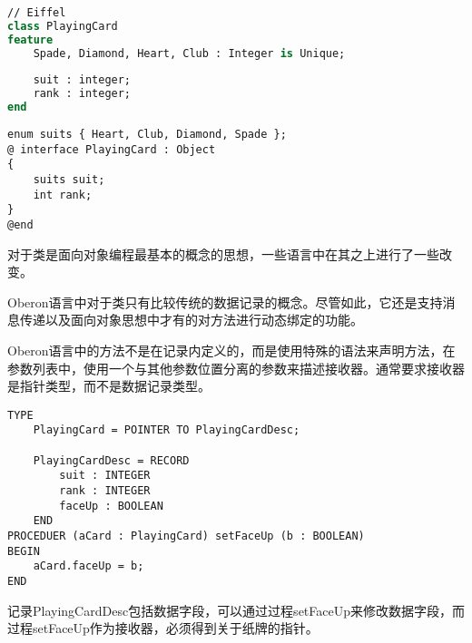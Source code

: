 \begin{lstlisting}[language=Eiffel]
// Eiffel
class PlayingCard
feature 
	Spade, Diamond, Heart, Club : Integer is Unique;
	
	suit : integer;
	rank : integer;
end
\end{lstlisting}





\begin{lstlisting}[language={[Objective]C}]
enum suits { Heart, Club, Diamond, Spade };
@ interface PlayingCard : Object
{
	suits suit;
	int rank;
}
@end
\end{lstlisting}


对于类是面向对象编程最基本的概念的思想，一些语言中在其之上进行了一些改变。

Oberon语言中对于类只有比较传统的数据记录的概念。尽管如此，它还是支持消息传递以及面向对象思想中才有的对方法进行动态绑定的功能。

Oberon语言中的方法不是在记录内定义的，而是使用特殊的语法来声明方法，在参数列表中，使用一个与其他参数位置分离的参数来描述接收器。通常要求接收器是指针类型，而不是数据记录类型。

\begin{lstlisting}[language=Oberon-2]
TYPE
	PlayingCard = POINTER TO PlayingCardDesc;
		
	PlayingCardDesc = RECORD
		suit : INTEGER
		rank : INTEGER
		faceUp : BOOLEAN
	END
PROCEDUER (aCard : PlayingCard) setFaceUp (b : BOOLEAN)
BEGIN
	aCard.faceUp = b;
END
\end{lstlisting}


记录PlayingCardDesc包括数据字段，可以通过过程setFaceUp来修改数据字段，而过程setFaceUp作为接收器，必须得到关于纸牌的指针。


\begin{lstlisting}[language=Oberon-2]

\end{lstlisting}




\begin{lstlisting}[language=Oberon-2]

\end{lstlisting}




\begin{lstlisting}[language=Oberon-2]

\end{lstlisting}




\begin{lstlisting}[language=Oberon-2]

\end{lstlisting}




